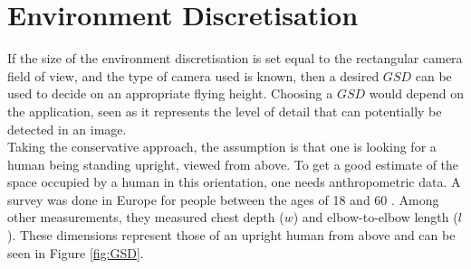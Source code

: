 \section{Environment Discretisation}
If the size of the environment discretisation is set equal to the rectangular camera field of view, and the type of camera used is known, then a desired $GSD$ can be used to decide on an appropriate flying height. Choosing a $GSD$ would depend on the application, seen as it represents the level of detail that can potentially be detected in an image.\\
Taking the conservative approach, the assumption is that one is looking for a human being standing upright, viewed from above. To get a good estimate of the space occupied by a human in this orientation, one needs anthropometric data. A survey was done in Europe for people between the ages of 18 and 60 \cite{Jurgens1998}. Among other measurements, they measured chest depth ($w$) and elbow-to-elbow length ($l$). These dimensions represent those of an upright human from above and can be seen in Figure \ref{fig:GSD}.\\ 
